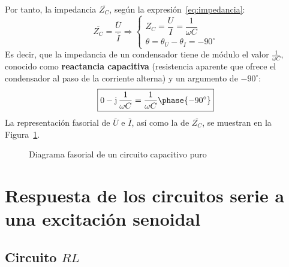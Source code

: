 Por tanto, la impedancia $\overline{Z_C}$, según la
expresión~\eqref{eq:impedancia}:
\begin{equation*}
  \overline{Z_C}=\dfrac{\overline{U}}{\overline{I}}\Rightarrow
  \begin{cases}
    Z_C=\dfrac{U}{I}=\dfrac{1}{\omega C}\\
    \theta=\theta_U-\theta_I=-90^\circ
  \end{cases}
\end{equation*}
Es decir, que la impedancia de un condensador tiene de módulo el valor
$\frac{1}{\omega C}$, conocido como \textbf{reactancia capacitiva}
(resistencia aparente que ofrece el condensador al paso de la
corriente alterna) y un argumento de $-90^\circ$:
\begin{equation}
  \boxed{0-\mathrm{j}\,\dfrac{1}{\omega C}=\dfrac{1}{\omega C}\phase{-90^\circ}}
\end{equation}
La representación fasorial de $\overline{U}$ e $\overline{I}$, así
como la de $\overline{Z_C}$, se muestran en la
Figura~\ref{fig:fasorCondensador}.
\begin{figure}[H]
  \centering {}\hfil
  \caption{Diagrama fasorial de un circuito capacitivo puro}
  \label{fig:fasorCondensador}
\end{figure}
	
\section{Respuesta de los circuitos serie a una excitación
  senoidal} \label{sec:respuesta_serie}
	
\subsection{Circuito $RL$}\label{sec:RL}
	

